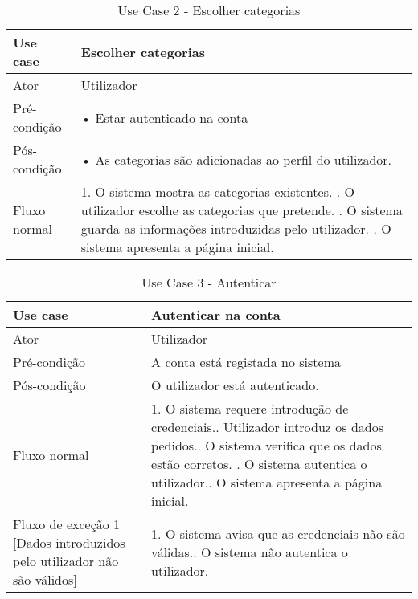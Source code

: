 \documentclass[a4paper,12pt]{scrreprt}
\begin{document}
  
  \begin{table}[htp]
      \begin{center}
        \begin{tabular}{ | m{11em} | m{10cm} | } 
          \hline
          Use case & Escolher categorias \\ 
          \hline
          Ator & Utilizador \\ 
          \hline
          Pré-condição & 
          • Estar autenticado na conta  \\
          \hline
          Pós-condição &
          • As categorias são adicionadas ao perfil do utilizador. \\ 
          \hline
          Fluxo normal & 
          1. O sistema mostra as categorias existentes. \newline
          2. O utilizador escolhe as categorias que pretende. \newline
          3. O sistema guarda as informações introduzidas pelo utilizador. \newline
          4. O sistema apresenta a página inicial.\\ 
          \hline 
  \end{tabular}
\end{center} 
  \label{Tab: usecase2}
\caption{Use Case 2 - Escolher categorias}
\end{table}
  
    \begin{table}[htp]
   \begin{center}
        \begin{tabular}{ | m{11em} | m{10cm} | } 
          \hline
          Use case & Autenticar na conta \\ 
          \hline
          Ator & Utilizador \\ 
          \hline
          Pré-condição & A conta está registada no sistema \\ 
          \hline
          Pós-condição & O utilizador está autenticado. \\ 
          \hline
          Fluxo normal & 
          1. O sistema requere introdução de credenciais.\newline 
          2. Utilizador introduz os dados pedidos.\newline
          3. O sistema verifica que os dados estão corretos. \newline
          4. O sistema autentica o utilizador.\newline
          5. O sistema apresenta a página inicial.\\
          \hline \cellcolor{red!50}
           Fluxo de exceção 1 [Dados introduzidos pelo utilizador não são válidos] &  
           1. O sistema avisa que as credenciais não são válidas.\newline
           2. O sistema não autentica o utilizador.\\ 
           \hline
  \end{tabular}
\end{center} 
  \label{Tab: usecase3}
\caption{Use Case 3 - Autenticar}
\end{table}
   
\end{document}
